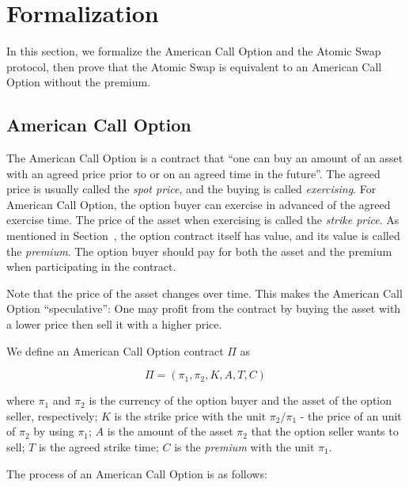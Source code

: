 \section{Formalization}
\label{sec:formalization}

In this section, we formalize the American Call Option and the Atomic Swap protocol,
then prove that the Atomic Swap is equivalent to an American Call Option without the premium.

\subsection{American Call Option}

The American Call Option is a contract that ``one can buy an amount of an asset with an agreed price prior to or on an agreed time in the future''. 
The agreed price is usually called the \textit{spot price}, and the buying is called \textit{exercising}.
For American Call Option, the option buyer can exercise in advanced of the agreed exercise time.
The price of the asset when exercising is called the \textit{strike price}.
As mentioned in Section~\label{subsec:background_option}, the option contract itself has value, and its value is called the \textit{premium}.
The option buyer should pay for both the asset and the premium when participating in the contract.

Note that the price of the asset changes over time. This makes the American Call Option ``speculative'': One may profit from the contract by buying the asset with a lower price then sell it with a higher price.

\begin{definition}
We define an American Call Option contract $\Pi$ as

$$\Pi = (\pi_1, \pi_2, K, A, T, C)$$

where
$\pi_1$ and $\pi_2$ is the currency of the option buyer and the asset of the option seller, respectively; 
$K$ is the strike price with the unit $\pi_2 / \pi_1$ - the price of an unit of $\pi_2$ by using $\pi_1$;
$A$ is the amount of the asset $\pi_2$ that the option seller wants to sell;
$T$ is the agreed strike time;
$C$ is the \textit{premium} with the unit $\pi_1$.
\end{definition}

The process of an American Call Option is as follows:

